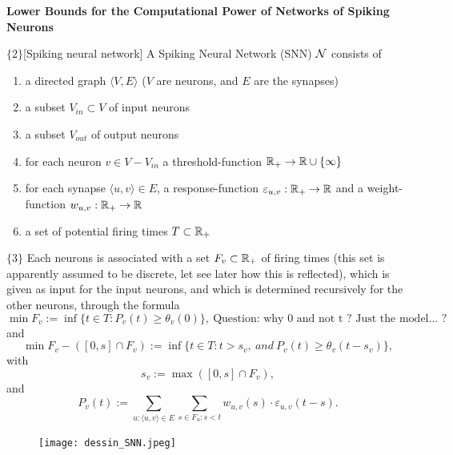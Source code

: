 \documentclass{article}
\begin{document}
\begin{center}
   \bf Lower Bounds for the Computational Power of Networks of Spiking Neurons
\end{center}

\begin{flexidefinition}{$\{2\}$}[Spiking neural network]
    A Spiking Neural Network (SNN) $\mathcal{N}$ consists of 
    \begin{enumerate}[label = (\alph*)]
        \item a directed graph $\langle V, E \rangle$ ($V$ are neurons, and $E$ are the synapses)
        \item a subset $V_{in} \subset V$ of input neurons
        \item a subset $V_{out}$ of output neurons
        \item for each neuron $v \in V - V_{in}$ a threshold-function $\mathbb{R}_+ \to \mathbb{R} \cup \{ \infty\}$
        \item for each synapse $\langle u,v \rangle \in E$, a response-function $\varepsilon_{u,v} : \mathbb{R}_+ \to \mathbb{R}$ and a weight-function $w_{u,v} : \mathbb{R}_+ \to \mathbb{R}$
        \item a set of potential firing times $T \subset \mathbb{R}_+$
    \end{enumerate}
\end{flexidefinition}

$\{3\}$ Each neurons is associated with a set $F_v \subset \mathbb{R}_+$ of firing times (this set is apparently assumed to be discrete, let see later how this is reflected), which is given as input for the input neurons, and which is determined recursively for the other neurons, through the formula
\begin{equation}
    \min F_v := \inf \{ t \in T : P_v(t) \geq \theta_v(0)\}, \ \text{Question: why 0 and not t ? Just the model... ?} 
\end{equation}
and
\begin{equation}
    \min F_v - ([0, s]\cap F_v) := \inf \{ t \in T : t> s_v, \ and \ P_v(t) \geq \theta_v(t-s_v)\},
\end{equation}
with 
\begin{equation}
    s_v := \max ([0,s] \cap F_v),
\end{equation}
and
\begin{equation}
    P_v(t) := \sum_{u : \langle u, v \rangle \in E}\sum_{s \in F_u : s < t} w_{u,v}(s) \cdot \varepsilon_{u,v}(t-s).
\end{equation}


\begin{figure}[h]
    \centering
    \texttt{[image: dessin\_SNN.jpeg]}
\end{figure}
\end{document}
